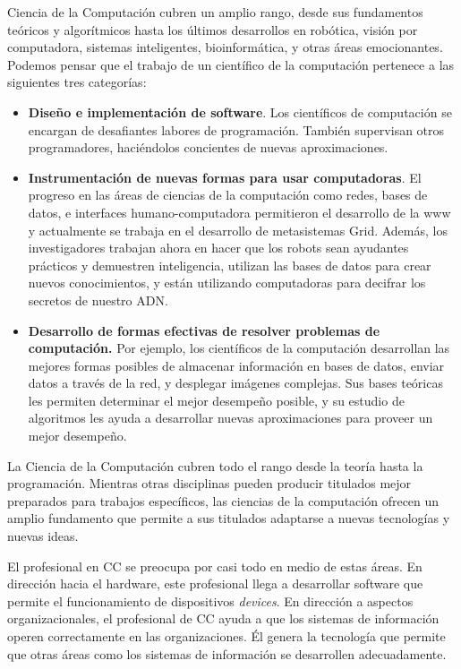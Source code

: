 Ciencia de la Computación cubren un amplio rango, desde sus fundamentos teóricos y algorítmicos hasta 
los \'ultimos desarrollos en robótica, visión por computadora, sistemas inteligentes, bioinformática, y
otras áreas emocionantes. Podemos pensar que el trabajo de un científico de la computación pertenece
a las siguientes tres categorías:

\begin{itemize}
\item \textbf{Diseño e implementación de software}. Los científicos de computación se encargan de
desafiantes labores de programación. También supervisan otros programadores, haciéndolos concientes
de nuevas aproximaciones.

\item \textbf{Instrumentación de nuevas formas para usar computadoras}. El progreso en las áreas
de ciencias de la computación como redes, bases de datos, e interfaces humano-computadora permitieron
el desarrollo de la www y actualmente se trabaja en el desarrollo de metasistemas Grid. Además,
los investigadores trabajan ahora en hacer que los robots sean ayudantes prácticos y demuestren
inteligencia, utilizan las bases de datos para crear nuevos conocimientos, y están utilizando
computadoras para decifrar los secretos de nuestro ADN.

\item \textbf{Desarrollo de formas efectivas de resolver problemas de computación.}
Por ejemplo, los científicos de la computación desarrollan las mejores formas posibles
de almacenar información en bases de datos, enviar datos a través de la red, y
desplegar imágenes complejas. Sus bases teóricas les permiten determinar el
mejor desempeño posible, y su estudio de algoritmos les ayuda a desarrollar
nuevas aproximaciones para proveer un mejor desempeño.
\end{itemize}

La Ciencia de la Computación cubren todo el rango desde la teoría hasta la programación. Mientras otras disciplinas pueden producir titulados mejor preparados para trabajos específicos, las ciencias de la computación ofrecen un amplio fundamento que permite a sus titulados adaptarse a nuevas tecnologías y nuevas ideas.

El profesional en \ac{CC} se preocupa por casi todo en medio de estas áreas. En dirección hacia el hardware, este profesional llega a desarrollar software que permite el funcionamiento de dispositivos {\it devices}. En dirección a aspectos organizacionales, el profesional de \ac{CC} ayuda a que los sistemas de información operen correctamente en las organizaciones. Él genera la tecnología que permite que otras áreas como los sistemas de información se desarrollen adecuadamente.


